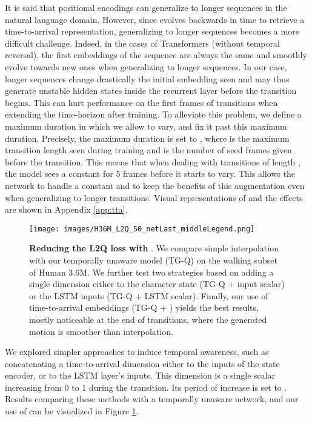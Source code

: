 \documentclass[acmtog]{acmart}
\begin{document}
It is said that positional encodings can generalize to longer sequences in the natural language domain. However, since  evolves backwards in time to retrieve a time-to-arrival representation, generalizing to longer sequences becomes a more difficult challenge. Indeed, in the cases of Transformers (without temporal reversal), the first embeddings of the sequence are always the same and smoothly evolve towards new ones when generalizing to longer sequences. In our case, longer sequences change drastically the initial embedding seen and may thus generate unstable hidden states inside the recurrent layer before the transition begins. This can hurt performance on the first frames of transitions when extending the time-horizon after training. To alleviate this problem, we define a maximum duration in which we allow  to vary, and fix it past this maximum duration. Precisely, the maximum duration  is set to , where  is the maximum transition length seen during training and  is the number of seed frames given before the transition. This means that when dealing with transitions of length , the model sees a constant  for 5 frames before it starts to vary.
This allows the network to handle a constant  and to keep the benefits of this augmentation even when generalizing to longer transitions. Visual representations of  and the effects  are shown in Appendix \ref{app:tta}.

\begin{figure}[h]
\begin{center}
\centerline{\texttt{[image: images/H36M\_L2Q\_50\_netLast\_middleLegend.png]}}
  \caption{\textbf{Reducing the L2Q loss with }. We compare simple interpolation with our temporally unaware model (TG-Q) on the walking subset of Human 3.6M. We further test two strategies based on adding a single  dimension either to the character state (TG-Q +  input scalar) or the LSTM inputs (TG-Q +  LSTM scalar). Finally, our use of time-to-arrival embeddings (TG-Q + ) yields the best results, mostly noticeable at the end of transitions, where the generated motion is smoother than interpolation.}
  \label{fig:tta_effects}
\end{center}
\vspace{-0.5cm}
\end{figure}

We explored simpler approaches to induce temporal awareness, such as concatenating a time-to-arrival dimension either to the inputs of the state encoder, or to the LSTM layer's inputs. This  dimension is a single scalar increasing from 0 to 1 during the transition. Its period of increase is set to . Results comparing these methods with a temporally unaware network, and our use of  can be visualized in Figure \ref{fig:tta_effects}.
\end{document}
